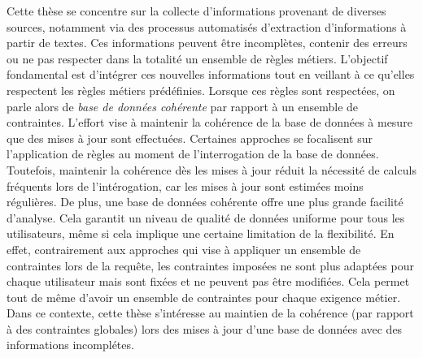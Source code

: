 Cette thèse se concentre sur la collecte d'informations provenant de diverses sources, notamment via des processus automatisés d'extraction d'informations à partir de textes.
Ces informations peuvent être incomplètes, contenir des erreurs ou ne pas respecter dans la totalité un ensemble de règles métiers.
L'objectif fondamental est d'intégrer ces nouvelles informations tout en veillant à ce qu'elles respectent les règles métiers prédéfinies.
Lorsque ces règles sont respectées, on parle alors de \emph{base de données cohérente} par rapport à un ensemble de contraintes.
L'effort vise à maintenir la cohérence de la base de données à mesure que des mises à jour sont effectuées.
Certaines approches se focalisent sur l'application de règles au moment de l'interrogation de la base de données.
Toutefois, maintenir la cohérence dès les mises à jour réduit la nécessité de calculs fréquents lors de l'intérogation, car les mises à jour sont estimées moins régulières.
De plus, une base de données cohérente offre une plus grande facilité d'analyse. %
Cela garantit un niveau de qualité de données uniforme pour tous les utilisateurs, même si cela implique une certaine limitation de la flexibilité.
En effet, contrairement aux approches qui vise à appliquer un ensemble de contraintes lors de la requête, les contraintes imposées ne sont plus adaptées pour chaque utilisateur mais sont fixées et ne peuvent pas être modifiées.
Cela permet tout de même d'avoir un ensemble de contraintes pour chaque exigence métier.
Dans ce contexte, cette thèse s'intéresse au maintien de la cohérence (par rapport à des contraintes globales) lors des mises à jour d'une base de données avec des informations incomplétes.

